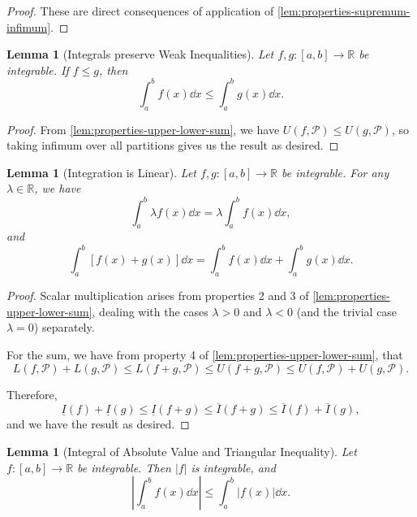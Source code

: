 \documentclass[11pt]{article}
\numberwithin{equation}{section}
\newtheorem{lemma}[theorem]{Lemma}
\theoremstyle{definition}
\theoremstyle{remark}
\newcommand{\pqty}[1]{\left(#1\right)}
\newcommand{\bqty}[1]{\left[#1\right]}
\newcommand{\abs}[1]{\left|#1\right|}
\newcommand{\ccintv}[2]{[#1,#2]}
\newcommand{\functiondomain}[3]{#1:#2\to #3}
\newcommand{\RR}{\mathbb R}
\newcommand{\partition}{\mathcal P}
\newcommand{\upperSum}{U}
\newcommand{\lowerSum}{L}
\newcommand{\upperI}{\overline I}
\newcommand{\lowerI}{\underline I}
\begin{document}
\begin{proof}
    These are direct consequences of application of \autoref{lem:properties-supremum-infimum}.
\end{proof}

\begin{lemma}[Integrals preserve Weak Inequalities]\label{analysis-unit-0161}
    \label{lem:integral-preserve-weak-inequalities}%
    Let \(\functiondomain{f, g}{\ccintv{a}{b}}{\RR}\) be integrable. If \(f \leq g\), then
    \[
        \int_{a}^{b} f\pqty{x} \dd{x} \leq \int_{a}^{b} g\pqty{x} \dd{x}.
    \]
\end{lemma}

\begin{proof}
    From \autoref{lem:properties-upper-lower-sum}, we have \(\upperSum\pqty{f, \partition} \leq \upperSum\pqty{g, \partition}\), so taking infimum over all partitions gives us the result as desired.
\end{proof}

\begin{lemma}[Integration is Linear]\label{analysis-unit-0162}
    \label{lem:integral-linear}%
    Let \(\functiondomain{f, g}{\ccintv{a}{b}}{\RR}\) be integrable. For any \(\lambda \in \RR\), we have
    \[
        \int_{a}^{b} \lambda f\pqty{x} \dd{x} = \lambda \int_{a}^{b} f\pqty{x} \dd{x},
    \]
    and
    \[
        \int_{a}^{b} \bqty{f\pqty{x} + g\pqty{x}} \dd{x} = \int_{a}^{b} f\pqty{x} \dd{x} + \int_{a}^{b} g\pqty{x} \dd{x}.
    \]
\end{lemma}

\begin{proof}
    Scalar multiplication arises from properties 2 and 3 of \autoref{lem:properties-upper-lower-sum}, dealing with the cases \(\lambda > 0\) and \(\lambda < 0\) (and the trivial case \(\lambda = 0\)) separately.
    
    For the sum, we have from property 4 of \autoref{lem:properties-upper-lower-sum}, that
    \[
        \lowerSum\pqty{f, \partition} + \lowerSum\pqty{g, \partition} \leq \lowerSum\pqty{f + g, \partition} \leq \upperSum\pqty{f + g, \partition} \leq \upperSum\pqty{f, \partition} + \upperSum\pqty{g, \partition}.
    \]

    Therefore,
    \[
        \lowerI\pqty{f} + \lowerI\pqty{g} \leq \lowerI\pqty{f + g} \leq \upperI\pqty{f + g} \leq \upperI\pqty{f} + \upperI\pqty{g},
    \]
    and we have the result as desired.
\end{proof}

\begin{lemma}[Integral of Absolute Value and Triangular Inequality]\label{analysis-unit-0163}
    \label{lem:integral-absolute-value-triangular-inequality}%
    Let \(\functiondomain{f}{\ccintv{a}{b}}{\RR}\) be integrable. Then \(\abs{f}\) is integrable, and
    \[
        \abs{\int_{a}^{b} f\pqty{x} \dd{x}} \leq \int_{a}^{b} \abs{f\pqty{x}} \dd{x}.
    \]
\end{lemma}
\end{document}
